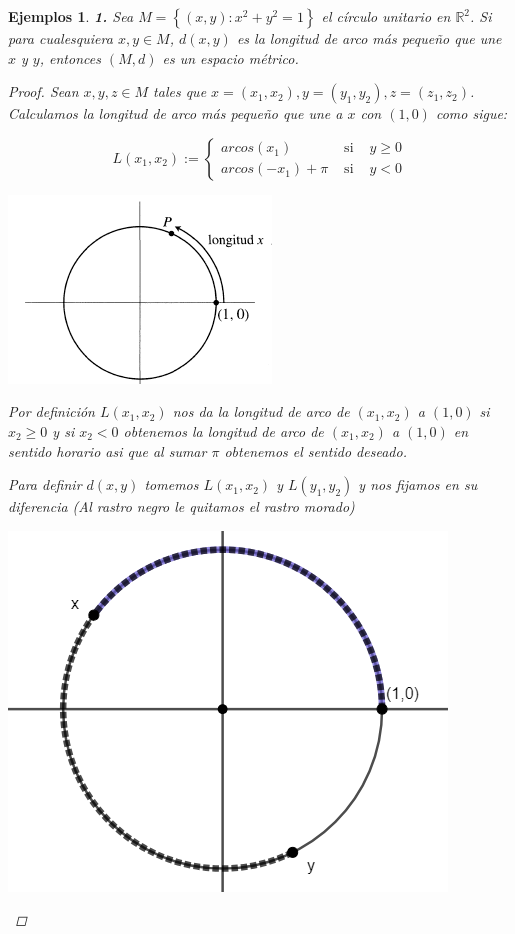 \documentclass[oneside]{book} %
\theoremstyle{Teorema}
\theoremstyle{Ejemplos}
\newtheorem{Ejemplos}[Definicion]{Ejemplos}
\theoremstyle{[Obs]}
\renewcommand{\{}{\left\lbrace} %
\renewcommand{\}}{\right\rbrace} %
\newcommand{\Ri}[1]{\mathbb{R}^{#1}} %
\begin{document}
			\begin{Ejemplos}\setlength{\parindent}{0em}

				\textbf{1.} Sea $M = \{ (x, y) : x^2 + y^2 = 1 \}$ el círculo unitario en $\Ri{2}$. Si para cualesquiera $x, y \in M$, $d(x, y)$ es la longitud de arco más pequeño que une $x$ y $y$, entonces $(M, d)$ es un espacio métrico. 

				\begin{proof}
					
					Sean $x, y, z \in M$ tales que $x = (x_1, x_2), y = (y_1, y_2), z = (z_1, z_2)$. Calculamos la longitud de arco más pequeño que une a $x$ con $(1, 0)$ como sigue: 
					
					\[ L(x_1, x_2) := \{ \begin{array}{lcc}
						arcos(x_1) & \text{ si } & y \geq 0 \\
						arcos(-x_1) + \pi & \text{ si } & y < 0
					\end{array} \right. \]

					\begin{center}
						\includegraphics{./img/1.png}
					\end{center}

					Por definición $L(x_1, x_2)$ nos da la longitud de arco de $(x_1, x_2)$ a $(1, 0)$ si $x_2 \geq 0$ y si $x_2 < 0$ obtenemos la longitud de arco de $(x_1, x_2)$ a $(1, 0)$ en sentido horario asi que al sumar $\pi$ obtenemos el sentido deseado.

					Para definir $d(x, y)$ tomemos $L(x_1, x_2)$ y $L(y_1, y_2)$ y nos fijamos en su diferencia (Al rastro negro le quitamos el rastro morado)

					\begin{center}
						\includegraphics{./img/2.png}
					\end{center}


\end{proof}
\end{Ejemplos}
\end{document}
